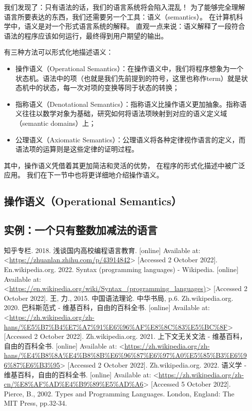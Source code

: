 \documentclass[../main.tex]{subfiles}
\begin{document}
  \indent 我们发现了：只有语法的话，我们的语言系统将会陷入混乱！
  为了能够完全理解语言所要表达的东西，我们还需要另一个工具：语义（semantics）。
  在计算机科学中，语义是对一个形式语言系统的解释。\cite{semwiki}
  直观一点来说：语义解释了一段符合语法的程序应该如何运行，最终得到用户期望的输出。

  \indent 有三种方法可以形式化地描述语义：\cite{tapl}

  \begin{itemize}
    \item 操作语义（Operational Semantics）：在操作语义中，我们将程序想象为一个状态机。语法中的项（也就是我们先前提到的符号，这里也称作term）就是状态机中的状态，每一次对项的变换等同于状态的转换；
    \item 指称语义（Denotational Semantics）：指称语义比操作语义更加抽象。指称语义往往以数学对象为基础，研究如何将语法项映射到对应的语义定义域（semantic domains）上；
    \item 公理语义（Axiomatic Semantics）：公理语义将各种定律视作语言的定义，而语法项的运算则是这些定律的证明过程。
  \end{itemize}

  \indent 其中，操作语义凭借着其更加简洁和灵活的优势，
  在程序的形式化描述中被广泛应用。\cite{tapl}
  我们在下一节中也将更详细地介绍操作语义。

  \subsection{操作语义（Operational Semantics）}

  \subsection{实例：一个只有整数加减法的语言}

  \begin{thebibliography}{7}
     知乎专栏. 2018. 浅谈国内高校编程语言教育. [online] Available at: <\url{https://zhuanlan.zhihu.com/p/43914842}> [Accessed 2 October 2022].
     En.wikipedia.org. 2022. Syntax (programming languages) - Wikipedia. [online] Available at: <\url{https://en.wikipedia.org/wiki/Syntax_(programming_languages)}> [Accessed 2 October 2022].
     王, 力., 2015. 中国语法理论. 中华书局, p.6.
     Zh.wikipedia.org. 2020. 巴科斯范式 - 维基百科，自由的百科全书. [online] Available at: <\url{https://zh.wikipedia.org/zh-hans/%E5%B7%B4%E7%A7%91%E6%96%AF%E8%8C%83%E5%BC%8F}> [Accessed 2 October 2022]. 
     Zh.wikipedia.org. 2021. 上下文无关文法 - 维基百科，自由的百科全书. [online] Available at: <\url{https://zh.wikipedia.org/zh-hans/%E4%B8%8A%E4%B8%8B%E6%96%87%E6%97%A0%E5%85%B3%E6%96%87%E6%B3%95}> [Accessed 2 October 2022].
     Zh.wikipedia.org. 2022. 语义学 - 维基百科，自由的百科全书. [online] Available at: <\url{https://zh.wikipedia.org/zh-cn/%E8%AF%AD%E4%B9%89%E5%AD%A6}> [Accessed 5 October 2022].
     Pierce, B., 2002. Types and Programming Languages. London, England: The MIT Press, pp.32-34.
  \end{thebibliography}
\end{document}
